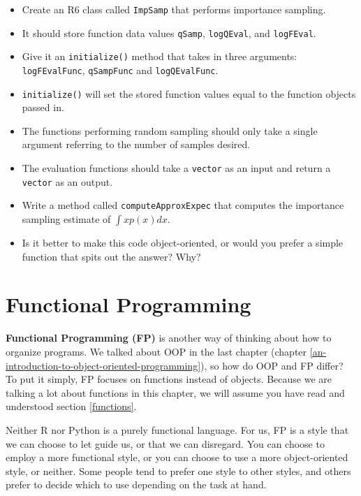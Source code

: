 \documentclass[
  12pt,
  krantz2]{krantz}
\providecommand{\tightlist}{%
  \setlength{\itemsep}{0pt}\setlength{\parskip}{0pt}}
\begin{document}
\begin{itemize}
\tightlist
\item
  Create an R6 class called \texttt{ImpSamp} that performs importance sampling.
\item
  It should store function data values \texttt{qSamp}, \texttt{logQEval}, and \texttt{logFEval}.
\item
  Give it an \texttt{initialize()} method that takes in three arguments: \texttt{logFEvalFunc}, \texttt{qSampFunc} and \texttt{logQEvalFunc}.
\item
  \texttt{initialize()} will set the stored function values equal to the function objects passed in.
\item
  The functions performing random sampling should only take a single argument referring to the number of samples desired.
\item
  The evaluation functions should take a \texttt{vector} as an input and return a \texttt{vector} as an output.
\item
  Write a method called \texttt{computeApproxExpec} that computes the importance sampling estimate of \(\int x p(x) dx\).
\item
  Is it better to make this code object-oriented, or would you prefer a simple function that spits out the answer? Why?
\end{itemize}

\hypertarget{functional-programming}{%
\chapter{Functional Programming}\label{functional-programming}}

\textbf{Functional Programming (FP)} is another way of thinking about how to organize programs. We talked about OOP in the last chapter (chapter \ref{an-introduction-to-object-oriented-programming}), so how do OOP and FP differ? To put it simply, FP focuses on functions instead of objects. Because we are talking a lot about functions in this chapter, we will assume you have read and understood section \ref{functions}.

Neither R nor Python is a purely functional language. For us, FP is a style that we can choose to let guide us, or that we can disregard. You can choose to employ a more functional style, or you can choose to use a more object-oriented style, or neither. Some people tend to prefer one style to other styles, and others prefer to decide which to use depending on the task at hand.
\end{document}
